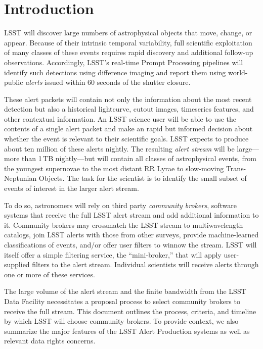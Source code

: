\section{Introduction}\label{sec:introduction}

LSST will discover large numbers of astrophysical objects that move, change, or appear.
Because of their intrinsic temporal variability, full scientific exploitation of many classes of these events requires rapid discovery and additional follow-up observations.
Accordingly, LSST's real-time Prompt Processing pipelines will identify such detections using difference imaging and report them using world-public \textit{alerts} issued within 60 seconds of the shutter closure.

These alert packets will contain not only the information about the most recent detection but also a historical lightcurve, cutout images, timeseries features, and other contextual information.
An LSST science user will be able to use the contents of a single alert packet and make an rapid but informed decision about whether the event is relevant to their scientific goals.
LSST expects to produce about ten million of these alerts nightly.
The resulting \textit{alert stream} will be large---more than 1\,TB nightly---but will contain all classes of astrophysical events, from the youngest supernovae to the most distant RR Lyrae to slow-moving Trans-Neptunian Objects.
The task for the scientist is to identify the small subset of events of interest in the larger alert stream.

To do so, astronomers will rely on third party \textit{community brokers}, software systems that receive the full LSST alert stream and add additional information to it.
Community brokers may crossmatch the LSST stream to multiwavelength catalogs, join LSST alerts with those from other surveys, provide machine-learned classifications of events, and/or offer user filters to winnow the stream.
LSST will itself offer a simple filtering service, the ``mini-broker,'' that will apply user-supplied filters to the alert stream.
Individual scientists will receive alerts through one or more of these services.

The large volume of the alert stream and the finite bandwidth from the LSST Data Facility necessitates a proposal process to select community brokers to receive the full stream.
This document outlines the process, criteria, and timeline by which LSST will choose community brokers.
To provide context, we also summarize the major features of the LSST Alert Production systems as well as relevant data rights concerns.

